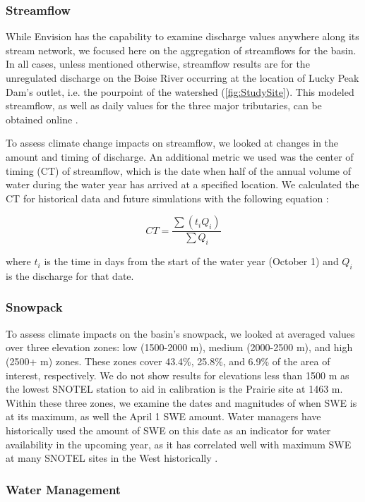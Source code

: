 \documentclass[water,article,submit,moreauthors,pdftex,10pt,a4paper]{mdpi}
\theoremstyle{mdpi}
\newcounter{ex}
\newcounter{re}
\theoremstyle{mdpidefinition}
\begin{document}
\subsubsection{Streamflow}
While Envision has the capability to examine discharge values anywhere along its stream network, we focused here on the aggregation of streamflows for the basin. In all cases, unless mentioned otherwise, streamflow results are for the unregulated discharge on the Boise River occurring at the location of Lucky Peak Dam's outlet, i.e. the pourpoint of the watershed (\cref{fig:StudySite}). This modeled streamflow, as well as daily values for the three major tributaries, can be obtained online \citep{Steimke:2017hb}. 

To assess climate change impacts on streamflow, we looked at changes in the amount and timing of discharge. An additional metric we used was the center of timing (CT) of streamflow, which is the date when half of the annual volume of water during the water year has arrived at a specified location. We calculated the CT for historical data and future simulations with the following equation \citep{Stewart:2005ed}: 

\begin{equation}
CT = \frac{\sum \left(t_iQ_i\right)}{\sum Q_i}
\end{equation}

where $t_i$ is the time in days from the start of the water year (October 1) and $Q_i$ is the discharge for that date. 

\subsubsection{Snowpack}

To assess climate impacts on the basin’s snowpack, we looked at averaged values over three elevation zones: low (1500-2000 m), medium (2000-2500 m), and high (2500+ m) zones. These zones cover 43.4\%, 25.8\%, and 6.9\% of the area of interest, respectively. We do not show results for elevations less than 1500 m as the lowest SNOTEL station to aid in calibration is the Prairie site at 1463 m. Within these three zones, we examine the dates and magnitudes of when SWE is at its maximum, as well the April 1 SWE amount. Water managers have historically used the amount of SWE on this date as an indicator for water availability in the upcoming year, as it has correlated well with maximum SWE at many SNOTEL sites in the West historically \citep{Bohr:2001bc}.

\subsubsection{Water Management}
\end{document}
